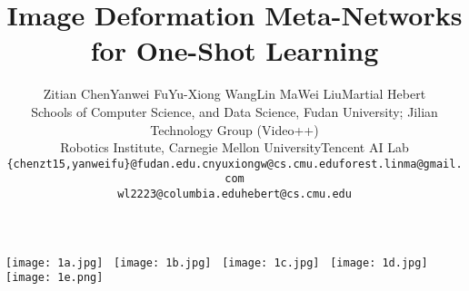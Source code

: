 \documentclass[10pt,letterpaper,twocolumn]{article}
\begin{document}
\title{Image Deformation Meta-Networks for One-Shot Learning}




\author{Zitian Chen\qquad Yanwei Fu\qquad Yu-Xiong Wang\qquad Lin Ma\qquad Wei Liu\qquad Martial Hebert\\Schools of Computer Science, and Data Science, Fudan University; Jilian Technology Group (Video++) \\ Robotics Institute, Carnegie Mellon University\qquad Tencent AI Lab\\  {\tt\small \{chenzt15,yanweifu\}@fudan.edu.cn\qquad yuxiongw@cs.cmu.edu\qquad forest.linma@gmail.com} \\ {\tt\small wl2223@columbia.edu\qquad hebert@cs.cmu.edu}}



\maketitle

\pagestyle{empty}  \thispagestyle{empty} 



\begin{strip}
\centering
\texttt{[image: 1a.jpg]}~
\texttt{[image: 1b.jpg]}~
\texttt{[image: 1c.jpg]}~
\texttt{[image: 1d.jpg]}~
\texttt{[image: 1e.png]}\\
\qquad\qquad\qquad\quad\qquad
{}\qquad\qquad\qquad\qquad\quad
{}\qquad\qquad\qquad\quad\quad
{}\qquad\qquad\qquad\quad\qquad
{}
\vspace{0.05in}
\end{strip}
\end{document}
